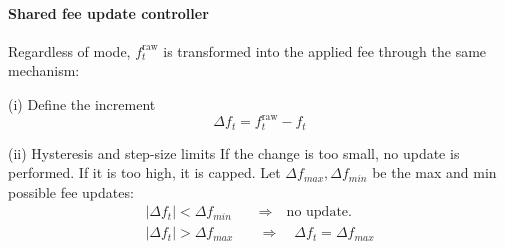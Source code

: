 \documentclass[11pt]{article}
\begin{document}

\paragraph{Shared fee update controller}
Regardless of mode, $f^{\mathrm{raw}}_t$ is transformed into the applied fee through the same mechanism:

(i) Define the increment
\begin{equation}
  \Delta f_t = f^{\mathrm{raw}}_t - f_t
\end{equation}

(ii) Hysteresis and step-size limits \newline
If the change is too small, no update is performed. If it is too high, it is capped. Let $\Delta f_{max}, \Delta f_{min}$ be the max and min possible fee updates:
\begin{align}
  |\Delta f_t| < \Delta f_{min} 
  \quad&\Rightarrow\quad \text{no update.} \\ 
  |\Delta f_t| > \Delta f_{max} \quad&\Rightarrow\quad \Delta f_t=\Delta f_{max}
\end{align}
\end{document}
